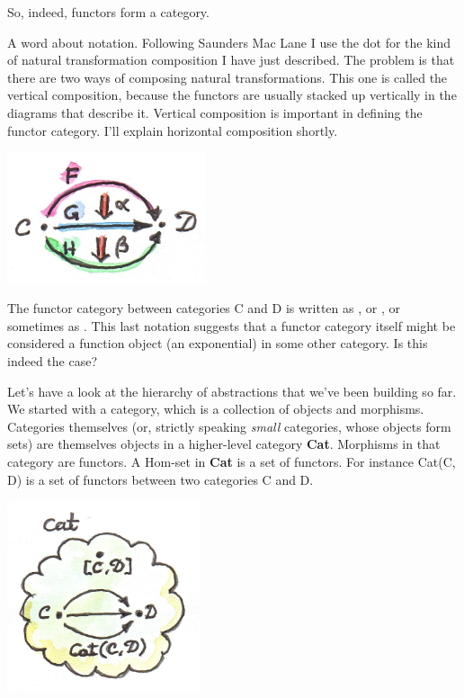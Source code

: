 So, indeed, functors form a category.

A word about notation. Following Saunders Mac Lane I use the dot for the
kind of natural transformation composition I have just described. The
problem is that there are two ways of composing natural transformations.
This one is called the vertical composition, because the functors are
usually stacked up vertically in the diagrams that describe it. Vertical
composition is important in defining the functor category. I'll explain
horizontal composition shortly.

\includegraphics[width=2.29167in]{images/6a_vertical.jpg}

The functor category between categories C and D is written as
, or \code{{[}C,\ D{]}}, or sometimes as
. This last notation suggests that a functor category itself
might be considered a function object (an exponential) in some other
category. Is this indeed the case?

Let's have a look at the hierarchy of abstractions that we've been
building so far. We started with a category, which is a collection of
objects and morphisms. Categories themselves (or, strictly speaking
\emph{small} categories, whose objects form sets) are themselves objects
in a higher-level category \textbf{Cat}. Morphisms in that category are
functors. A Hom-set in \textbf{Cat} is a set of functors. For instance
Cat(C, D) is a set of functors between two categories C and D.

\includegraphics[width=2.23958in]{images/7_cathomset.jpg}

